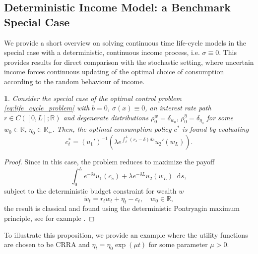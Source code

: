 \documentclass[11pt,oneside,english,reqno,dvipsnames,table]{amsart}
\numberwithin{equation}{section}
\theoremstyle{plain}
\theoremstyle{definition}
\theoremstyle{remark}
\theoremstyle{plain}
\theoremstyle{plain}
\newtheorem{prop}[thm]{\protect\propositionname}
\theoremstyle{plain}
\theoremstyle{plain}
\theoremstyle{plain}
\theoremstyle{plain}
\theoremstyle{plain}
\providecommand{\propositionname}{Proposition}
\newcommand{\RR}{\mathbb{R}}
\newcommand{\dd}{\mathop{}\!\mathrm{d}}
\newcommand{\mbR}{\mathbb{R}}
\numberwithin{thm}{section}
\begin{document}
\subsection{Deterministic Income Model: a Benchmark Special Case}\label{sec:deterministic_life_cycle}


We provide a short overview on solving continuous time life-cycle models in the special case with a deterministic, continuous income process, i.e. $\sigma \equiv 0$. This provides results for direct comparison with the stochastic setting, where uncertain income forces continuous updating of the optimal choice of consumption according to the random behaviour of income. 

\begin{prop}\label{prop:determ}
 Consider the special case of the optimal control problem \ref{eq:life_cycle_problem} with $b=0$, $\sigma(x) \equiv 0$, an interest rate path $r\in C([0,L];\RR)$ and degenerate distributions $\rho^w_0 = \delta_{w_0},\,\rho^\eta_0 = \delta_{\eta_0}$ for some $w_0\in \mbR,\, \eta_0 \in \mbR_+$. Then, the optimal consumption policy $c^* $ is found by evaluating
\begin{equation}\label{det_c_wT}
    c_t^* =  (u_1')^{-1}\left( \lambda e^{ \int_t^L (r_s-\delta)ds}  u_2'(w_L) \right).  
\end{equation}
\end{prop}
%
\begin{proof}

Since in this case, the problem reduces to maximize the payoff 
   \begin{equation}\label{eq:max deterministic}
   \int_0^L e^{-\delta s} u_1(c_s) + \lambda e^{-\delta L}u_2(w_L)\dd s, 
\end{equation}
%
subject to the deterministic budget constraint for wealth $w$
%
\begin{equation}\label{det_bc}
    \dot{w}_t = r_t w_t + \eta_t - c_t,\quad w_0\in \RR,
\end{equation}
%
the result is classical and found using the deterministic Pontryagin maximum principle, see for example \cite[Sec. 10]{sydsaeter2008further}.  
\end{proof}
%
To illustrate this proposition, we provide an example where the utility functions are chosen to be CRRA and $\eta_t = \eta_0\exp(\mu t)$ for some parameter $\mu>0$. 
%
\end{document}
